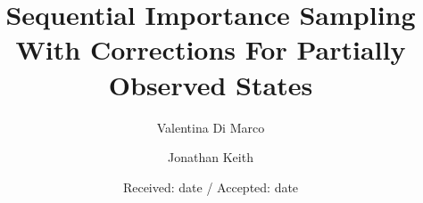 \newcommand{\Real}{\mathbb R}
\newcommand{\E}{\mathbb{E}}
\newcommand{\s}{\mathbb{S}}
\renewcommand{\P}{\mathbb{P}}
\newcommand{\K}{\mathbb{K}}
\newcommand{\Q}{\mathbb{Q}}
\newcommand{\eps}{\varepsilon}
\newcommand{\diag}{\mathrm{diag}}
\newcommand{\nbr}{\mathrm{nbr}}
\newcommand{\F}{\mathcal{F}}
\newcommand{\Qm}{\mathcal{Q}}
\newcommand{\M}{\mathcal{M}}
\newcommand{\Z}{\mathcal{Z}}
\newcommand{\csimplex}{\bar{\mathcal{S}}^{d-1}}
\newcommand{\osimplex}{\mathcal{S}^{d-1}}
\newcommand{\LL}{\mathcal{L}}
\newcommand{\Hil}{\mathscr{H}}
\newcommand{\G}{\mathscr{G}}
\newcommand{\p}{\mathscr{P}}
\newcommand{\C}{\mathscr{C}}
\newcommand{\one}[1]{\mathbf{1}_{\{#1\}}}
\newcommand{\oneset}[1]{\mathbf{1}_{#1}}
\newcommand{\argmin}{\mathrm{argmin}}
\newcommand{\argmax}{\mathrm{argmax}}
\newcommand{\var}{\mathrm{Var}}
\newcommand{\cov}{\mathrm{Cov}}
\newcommand{\ind}{\mathrm{I}}
\newcommand{\D}{\mathrm{d}}
\newcommand{\Borel}{\mathscr{B}}
\newcommand{\ben}{\begin{enumerate}}
\newcommand{\een}{\end{enumerate}}
\newcommand{\ds}{\displaystyle}
\newcommand{\voila}{\hfill $\blacksquare$}
\newcommand{\Id}{\mathrm{Id}}
\renewcommand{\Re}{\mathrm{Re}}
\renewcommand{\vec}[1]{\mathbf{#1}}
\renewcommand{\d}[1]{\ensuremath{\operatorname{d}\!{#1}}}
\newcommand*\diff{\mathop{}\!\mathrm{d}}

\DeclareMathOperator{\esssupp}{ess\,supp}


 \sloppy


\title{Sequential Importance Sampling With Corrections For Partially Observed States}

\author{Valentina Di Marco \and
        Jonathan Keith}

\\

\date{Received: date / Accepted: date}

\maketitle

